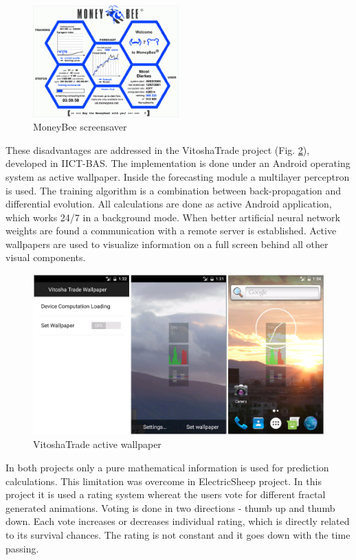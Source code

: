 \documentclass[runningheads]{llncs}
\begin{document}
\begin{figure}
\includegraphics[width=0.5\textwidth]{fig01.png}
\centering
\caption{MoneyBee screensaver} \label{fig01}
\end{figure}
\FloatBarrier

These disadvantages are addressed in the VitoshaTrade project (Fig. \ref{fig02}), developed in IICT-BAS. The implementation is done under an Android operating system as active wallpaper. Inside the forecasting module a multilayer perceptron is used. The training algorithm is a combination between back-propagation and differential evolution. All calculations are done as active Android application, which works 24/7 in a background mode. When better artificial neural network weights are found a communication with a remote server is established. Active wallpapers are used to visualize information on a full screen behind all other visual components. 

\begin{figure}
\includegraphics[width=1.0\textwidth]{fig02.png}
\centering
\caption{VitoshaTrade active wallpaper} \label{fig02}
\end{figure}
\FloatBarrier

In both projects only a pure mathematical information is used for prediction calculations. This limitation was overcome in ElectricSheep\cite{draves01} project. In this project it is used a rating system whereat the users vote for different fractal generated animations. Voting is done in two directions - thumb up and thumb down. Each vote increases or decreases individual rating, which is directly related to its survival chances. The rating is not constant and it goes down with the time passing. 
\end{document}
